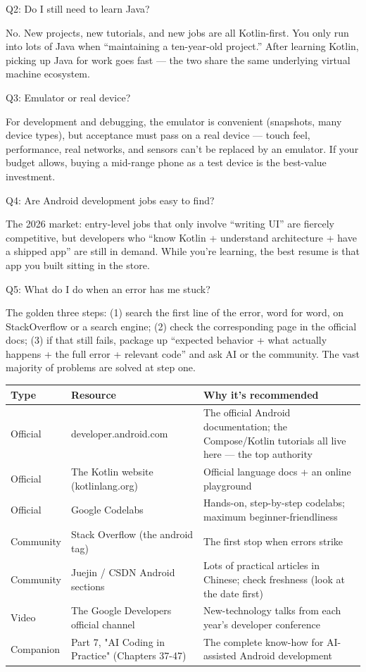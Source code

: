 Q2: Do I still need to learn Java?

No. New projects, new tutorials, and new jobs are all Kotlin-first. You only run into lots of Java when “maintaining a ten-year-old project.” After learning Kotlin, picking up Java for work goes fast — the two share the same underlying virtual machine ecosystem.

Q3: Emulator or real device?

For development and debugging, the emulator is convenient (snapshots, many device types), but acceptance must pass on a real device — touch feel, performance, real networks, and sensors can't be replaced by an emulator. If your budget allows, buying a mid-range phone as a test device is the best-value investment.

Q4: Are Android development jobs easy to find?

The 2026 market: entry-level jobs that only involve “writing UI” are fiercely competitive, but developers who “know Kotlin + understand architecture + have a shipped app” are still in demand. While you're learning, the best resume is that app you built sitting in the store.

Q5: What do I do when an error has me stuck?

The golden three steps: (1) search the first line of the error, word for word, on StackOverflow or a search engine; (2) check the corresponding page in the official docs; (3) if that still fails, package up “expected behavior + what actually happens + the full error + relevant code” and ask AI or the community. The vast majority of problems are solved at step one.


\begin{center}
\begin{tabularx}{\linewidth}{|X|X|X|}
\hline
\textbf{Type} & \textbf{Resource} & \textbf{Why it's recommended} \tabularnewline
\hline
Official & developer.android.com & The official Android documentation; the Compose/Kotlin tutorials all live here — the top authority \tabularnewline
Official & The Kotlin website (kotlinlang.org) & Official language docs + an online playground \tabularnewline
Official & Google Codelabs & Hands-on, step-by-step codelabs; maximum beginner-friendliness \tabularnewline
Community & Stack Overflow (the android tag) & The first stop when errors strike \tabularnewline
Community & Juejin / CSDN Android sections & Lots of practical articles in Chinese; check freshness (look at the date first) \tabularnewline
Video & The Google Developers official channel & New-technology talks from each year's developer conference \tabularnewline
Companion & Part 7, "AI Coding in Practice" (Chapters 37-47) & The complete know-how for AI-assisted Android development \tabularnewline
\hline
\end{tabularx}
\end{center}

